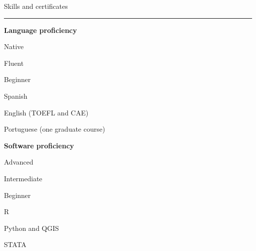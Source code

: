 \documentclass[a4paper, 12pt]{article}
\begin{document}
\large Skills and certificates
\smallskip
\hrule
\normalsize


\bigskip
\textbf{Language proficiency}

\begin{multicols}{2}

Native

Fluent

Beginner

\columnbreak

Spanish

English (TOEFL and CAE)

Portuguese (one graduate course)

\end{multicols}


\textbf{Software proficiency}

\begin{multicols}{2}

Advanced

Intermediate

Beginner

\columnbreak

\textsf{R}

\textsf{Python} and \textsf{QGIS}

\textsf{STATA}

\end{multicols}
\end{document}
